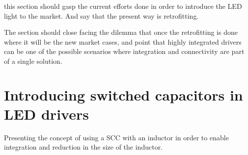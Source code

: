 this section should gasp the current efforts done in order to introduce the LED light to the market. And say that the present way is retrofitting.

The section should close facing the dilemma that once the retrofitting is done where it will be the new market cases, and point that highly integrated drivers
can be one of the possible scenarios where integration and connectivity are part of a single solution.


\chapter{Introducing switched capacitors in LED drivers}
Presenting the concept of using a SCC with an inductor in order to enable integration and reduction in the size of the inductor.




